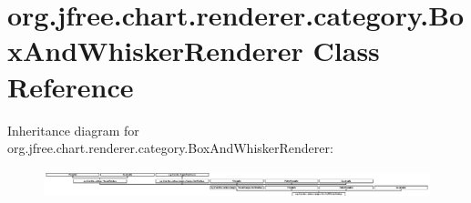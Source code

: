 \hypertarget{classorg_1_1jfree_1_1chart_1_1renderer_1_1category_1_1_box_and_whisker_renderer}{}\section{org.\+jfree.\+chart.\+renderer.\+category.\+Box\+And\+Whisker\+Renderer Class Reference}
\label{classorg_1_1jfree_1_1chart_1_1renderer_1_1category_1_1_box_and_whisker_renderer}
Inheritance diagram for org.\+jfree.\+chart.\+renderer.\+category.\+Box\+And\+Whisker\+Renderer\+:\begin{figure}[H]
\begin{center}
\leavevmode
\includegraphics[height=0.824742cm]{classorg_1_1jfree_1_1chart_1_1renderer_1_1category_1_1_box_and_whisker_renderer}
\end{center}
\end{figure}
